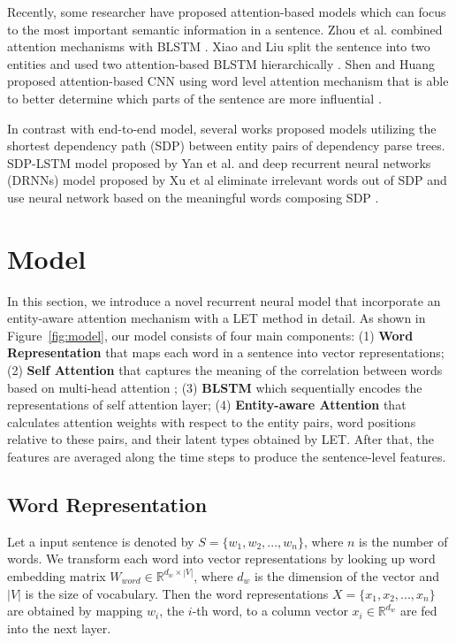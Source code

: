 \documentclass[twoside,leqno,twocolumn]{article}
\begin{document}
Recently, some researcher have proposed attention-based models which can focus to the most important semantic information in a sentence.
Zhou et al. combined attention mechanisms with BLSTM \cite{zhou2016attention}.
Xiao and Liu split the sentence into two entities and used two attention-based BLSTM hierarchically \cite{xiao2016semantic}.
Shen and Huang proposed attention-based CNN using word level attention mechanism that is able to better determine which parts of the sentence are more influential \cite{huang2016attention}.

In contrast with end-to-end model, several works proposed models utilizing the shortest dependency path (SDP) between entity pairs of dependency parse trees.
SDP-LSTM model proposed by Yan et al. and deep recurrent neural networks (DRNNs) model proposed by Xu et al eliminate irrelevant words out of SDP and use neural network based on the meaningful words composing SDP \cite{xu2015classifying, xu2016improved}.



\section{Model}
In this section, we introduce a novel recurrent neural model that incorporate an entity-aware attention mechanism with a LET method in detail.
As shown in Figure~\ref{fig:model}, our model consists of four main components: 
(1) \textbf{Word Representation} that maps each word in a sentence into vector representations; 
(2) \textbf{Self Attention} that captures the meaning of the correlation between words based on multi-head attention \cite{vaswani2017attention}; 
(3) \textbf{BLSTM} which sequentially encodes the representations of self attention layer;
(4) \textbf{Entity-aware Attention} that calculates attention weights with respect to the entity pairs, word positions relative to these pairs, and their latent types obtained by LET. 
After that, the features are averaged along the time steps to produce the sentence-level features.


\subsection{Word Representation}
Let a input sentence is denoted by $S=\{w_1, w_2, ..., w_n\}$, where $n$ is the number of words.
We transform each word into vector representations by looking up word embedding matrix $W_{word}\in \mathbb{R}^{d_w\times |V|}$, where $d_w$ is the dimension of the vector and $|V|$ is the size of vocabulary. 
Then the word representations $X=\{x_1, x_2, ..., x_n\}$ are obtained by mapping $w_i$, the $i$-th word, to a column vector $x_i\in \mathbb{R}^{d_w}$ are fed into the next layer.
\end{document}
